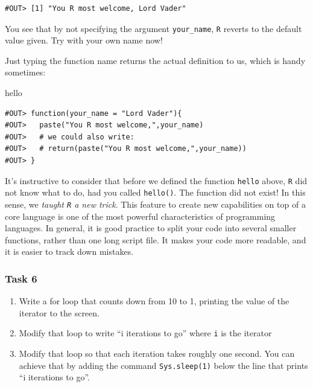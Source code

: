\documentclass[]{book}
\newenvironment{Shaded}{\begin{snugshade}}{\end{snugshade}}
\newcommand{\NormalTok}[1]{#1}
\providecommand{\tightlist}{%
  \setlength{\itemsep}{0pt}\setlength{\parskip}{0pt}}
\begin{document}
\begin{verbatim}
#OUT> [1] "You R most welcome, Lord Vader"
\end{verbatim}

You see that by not specifying the argument \texttt{your\_name}, \texttt{R} reverts to the default value given. Try with your own name now!

Just typing the function name returns the actual definition to us, which is handy sometimes:

\begin{Shaded}
\begin{Highlighting}[]
\NormalTok{hello}
\end{Highlighting}
\end{Shaded}

\begin{verbatim}
#OUT> function(your_name = "Lord Vader"){
#OUT>   paste("You R most welcome,",your_name)
#OUT>   # we could also write:
#OUT>   # return(paste("You R most welcome,",your_name))
#OUT> }
\end{verbatim}

It's instructive to consider that before we defined the function \texttt{hello} above, \texttt{R} did not know what to do, had you called \texttt{hello()}. The function did not exist! In this sense, we \emph{taught \texttt{R} a new trick}. This feature to create new capabilities on top of a core language is one of the most powerful characteristics of programming languages. In general, it is good practice to split your code into several smaller functions, rather than one long script file. It makes your code more readable, and it is easier to track down mistakes.

\hypertarget{task-6}{%
\subsubsection{Task 6}\label{task-6}}

\begin{enumerate}
\def\labelenumi{\arabic{enumi}.}
\tightlist
\item
  Write a for loop that counts down from 10 to 1, printing the value of the iterator to the screen.
\item
  Modify that loop to write ``i iterations to go'' where \texttt{i} is the iterator
\item
  Modify that loop so that each iteration takes roughly one second. You can achieve that by adding the command \texttt{Sys.sleep(1)} below the line that prints ``i iterations to go''.
\end{enumerate}
\end{document}
